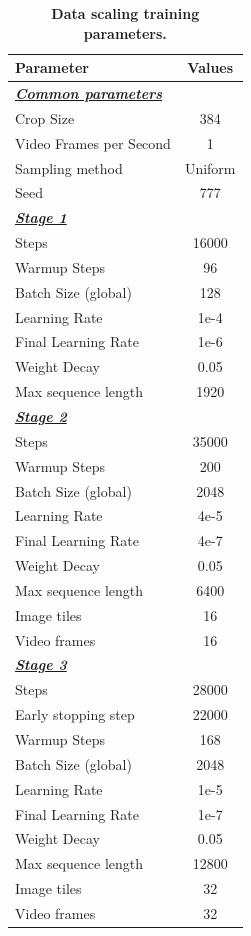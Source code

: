 \documentclass[]{fairmeta}
\begin{document}
\begin{table}[h]
    \small
    \caption{\small{\bf Data scaling training parameters.} }
    \centering
    \label{tab:data_scaling_params}
    \begin{tabular}{l c}
      \bf Parameter & \bf Values \\
        \toprule
        \multicolumn{2}{l}{\bf\it\underline{Common parameters}}\\[1ex]
        Crop Size & 384 \\
        Video Frames per Second & 1 \\
        Sampling method & Uniform \\
        Seed & 777 \\
        \multicolumn{2}{l}{\bf\it\underline{Stage 1}}\\[1ex]
        Steps & 16000 \\
        Warmup Steps & 96 \\
        Batch Size (global) & 128 \\
        Learning Rate & 1e-4 \\
        Final Learning Rate & 1e-6 \\
        Weight Decay & 0.05 \\
        Max sequence length & 1920 \\
        \multicolumn{2}{l}{\bf\it\underline{Stage 2}}\\[1ex]
        Steps & 35000 \\
        Warmup Steps & 200 \\
        Batch Size (global) & 2048 \\
        Learning Rate & 4e-5 \\
        Final Learning Rate & 4e-7 \\
        Weight Decay & 0.05 \\
        Max sequence length & 6400 \\
        Image tiles & 16 \\
        Video frames & 16 \\
        \multicolumn{2}{l}{\bf\it\underline{Stage 3}}\\[1ex]
        Steps & 28000 \\
        Early stopping step & 22000 \\
        Warmup Steps & 168 \\
        Batch Size (global) & 2048 \\
        Learning Rate & 1e-5 \\
        Final Learning Rate & 1e-7 \\
        Weight Decay & 0.05 \\
        Max sequence length & 12800 \\
        Image tiles & 32 \\
        Video frames & 32 \\
        \bottomrule
    \end{tabular}
\end{table}
\end{document}
